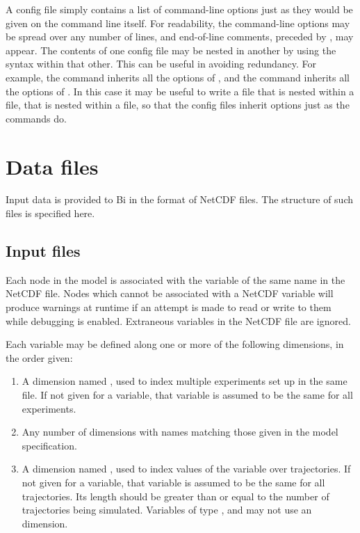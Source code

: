 A config file simply contains a list of command-line options just as they
would be given on the command line itself. For readability, the command-line
options may be spread over any number of lines, and end-of-line comments,
preceded by \bitt{\#}, may appear. The contents of one config file may be
nested in another by using the  syntax within that
other. This can be useful in avoiding redundancy. For example, the
 command inherits all the options of ,
and the  command inherits all the options of
. In this case it may be useful to write a
 file that is nested within a  file,
that is nested within a  file, so that the config files
inherit options just as the commands do.


\section{Data files\label{Data_files}}

Input data is provided to Bi in the format of NetCDF files. The
structure of such files is specified here.

\subsection{Input files}

Each node in the model is associated with the variable of the same name in the
NetCDF file. Nodes which cannot be associated with a NetCDF variable will
produce warnings at runtime if an attempt is made to read or write to them
while debugging is enabled. Extraneous variables in the NetCDF file are
ignored.

Each variable may be defined along one or more of the following dimensions, in
the order given:
\begin{enumerate}
\item A dimension named , used to index multiple experiments set up
  in the same file. If not given for a variable, that variable is assumed to
  be the same for all experiments.
\item Any number of dimensions with names matching those given in the model
  specification.
\item A dimension named , used to index values of the variable over
  trajectories. If not given for a variable, that variable is assumed to be
  the same for all trajectories. Its length should be greater than or equal to
  the number of trajectories being simulated. Variables of type
  ,  and  may not use an 
  dimension.
\end{enumerate}

